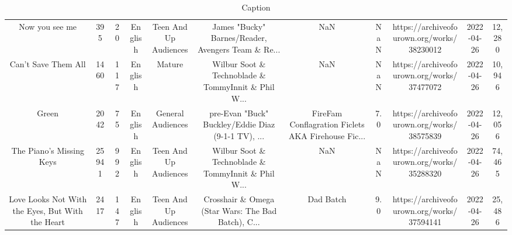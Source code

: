 \begin{table}[h!]
{\begin{tabular}{|c|c|c|c|c|c|c|c|c|c|c|}
                                    Now you see me &    395 &    20 &  English & Teen And Up Audiences & James "Bucky" Barnes/Reader, Avengers Team \& Re... &                                                NaN &   NaN & https://archiveofourown.org/works/38230012 & 2022-04-26 &    12,280 \\
                               Can't Save Them All &   1460 &   117 &  English &                Mature & Wilbur Soot \& Technoblade \& TommyInnit \& Phil W... &                                                NaN &   NaN & https://archiveofourown.org/works/37477072 & 2022-04-26 &    10,946 \\
                                             Green &   2042 &    75 &  English &     General Audiences & pre-Evan "Buck" Buckley/Eddie Diaz (9-1-1 TV), ... & FireFam Conflagration Ficlets AKA Firehouse Fic... &   7.0 & https://archiveofourown.org/works/38575839 & 2022-04-26 &    12,056 \\
                          The Piano's Missing Keys &  25941 &   992 &  English & Teen And Up Audiences & Wilbur Soot \& Technoblade \& TommyInnit \& Phil W... &                                                NaN &   NaN & https://archiveofourown.org/works/35288320 & 2022-04-26 &    74,465 \\
  Love Looks Not With the Eyes, But With the Heart &   2417 &   147 &  English & Teen And Up Audiences & Crosshair \& Omega (Star Wars: The Bad Batch), C... &                                          Dad Batch &   9.0 & https://archiveofourown.org/works/37594141 & 2022-04-26 &    25,486 \\
\hline
\end{tabular}}
 \caption{Caption}
 \label{tab:my_label}
\end{table}

